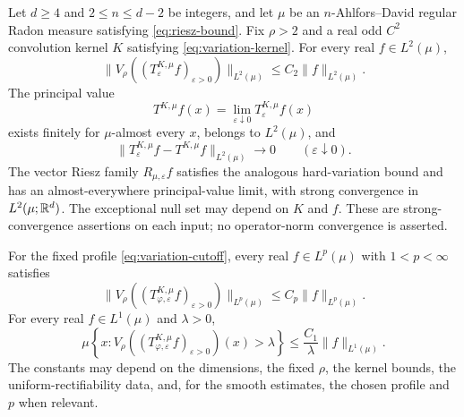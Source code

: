 \begin{corollary}\label{cor:variation}
Let $d\ge4$ and $2\le n\le d-2$ be integers, and let $\mu$ be an
$n$-Ahlfors--David regular Radon measure satisfying
\eqref{eq:riesz-bound}. Fix $\rho>2$ and a real odd $C^2$ convolution
kernel $K$ satisfying \eqref{eq:variation-kernel}. For every real
$f\in L^2(\mu)$,
\begin{equation}\label{eq:hard-variation-consequence}
 \bigl\|V_\rho((T^{K,\mu}_\varepsilon f)_{\varepsilon>0})\bigr\|_{L^2(\mu)}
 \le C_2\|f\|_{L^2(\mu)}.
\end{equation}
The principal value
\[
 T^{K,\mu}f(x)=\lim_{\varepsilon\downarrow0}T^{K,\mu}_\varepsilon f(x)
\]
exists finitely for $\mu$-almost every $x$, belongs to $L^2(\mu)$, and
\[
 \|T^{K,\mu}_\varepsilon f-T^{K,\mu}f\|_{L^2(\mu)}
 \longrightarrow0\qquad(\varepsilon\downarrow0).
\]
The vector Riesz family $R_{\mu,\varepsilon}f$ satisfies the analogous
hard-variation bound and has an almost-everywhere principal-value limit,
with strong convergence in $L^2(\mu;\mathbb R^d)$. The exceptional null set
may depend on $K$ and $f$. These are strong-convergence assertions on
each input; no operator-norm convergence is asserted.

For the fixed profile \eqref{eq:variation-cutoff}, every real
$f\in L^p(\mu)$ with $1<p<\infty$ satisfies
\begin{equation}\label{eq:smooth-variation-consequence}
 \bigl\|V_\rho((T^{K,\mu}_{\varphi,\varepsilon}f)_{\varepsilon>0})
 \bigr\|_{L^p(\mu)}
 \le C_p\|f\|_{L^p(\mu)}.
\end{equation}
For every real $f\in L^1(\mu)$ and $\lambda>0$,
\[
 \mu\left\{x:
 V_\rho((T^{K,\mu}_{\varphi,\varepsilon}f)_{\varepsilon>0})(x)
 >\lambda\right\}
 \le \frac{C_1}{\lambda}\|f\|_{L^1(\mu)}.
\]
The constants may depend on the dimensions, the fixed $\rho$, the kernel
bounds, the uniform-rectifiability data, and, for the smooth estimates,
the chosen profile and $p$ when relevant.
\end{corollary}

